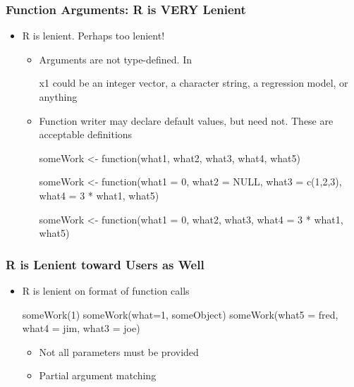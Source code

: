 \documentclass[11pt,english]{beamer}
\begin{document}
\begin{frame}[containsverbatim]
  \frametitle{Function Arguments: R is VERY Lenient}
  \begin{itemize}
      \item R is lenient. Perhaps too lenient!
        \begin{itemize}
        \item Arguments are not type-defined. In
          \begin{Sinput}
            myF <- function(x1, x2){
          \end{Sinput}
          x1 could be an integer vector, a character string, a regression model, or anything

        \item Function writer may declare default values, but need
          not. These are acceptable definitions

\begin{Sinput}
someWork <- function(what1, what2, what3, what4, what5)

someWork <- function(what1 = 0, what2 = NULL, what3 = c(1,2,3), what4 = 3 * what1, what5)

someWork <- function(what1 = 0, what2, what3, what4 = 3 * what1, what5)
\end{Sinput}

\end{itemize}

\end{itemize}
\end{frame}



\begin{frame}[containsverbatim]
  \frametitle{R is Lenient toward Users as Well}
  \begin{itemize}

\item R is lenient on format of function calls

\begin{Sinput}
someWork(1)
someWork(what=1, someObject)
someWork(what5 = fred, what4 = jim, what3 = joe)
\end{Sinput}
    \begin{itemize}
    \item Not all parameters must be provided
    \item Partial argument matching
    \end{itemize}
  \end{itemize}
\end{frame}
\end{document}
